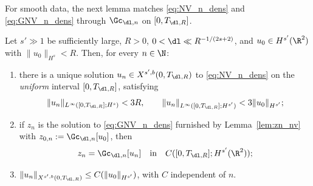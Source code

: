 For smooth data, the next lemma matches \eqref{eq:NV_n_dens} and
\eqref{eq:GNV_n_dens} through $\Gc_{\dl,n}$ on $[0,T_{\dl,R}]$.

\begin{lemma}\label{lem:equiv_n_nv}
Let $s'\gg 1$ be sufficiently large, $R>0$,
$0<\dl\ll R^{-1/(2s+2)}$, and $u_0\in H^{s'}(\R^2)$ with
$\|u_0\|_{H^s}<R$. Then, for every $n\in\N$:
\begin{enumerate}
\item[\textup{(i)}] there is a unique solution
$u_n\in X^{s',b}(0,T_{\dl,R})$ to \eqref{eq:NV_n_dens} on the
\emph{uniform} interval $[0,T_{\dl,R}]$, satisfying
\begin{equation}\label{eq:bounds_un}
\|u_n\|_{L^\infty([0,T_{\dl,R}];H^s)}<3R,
\qquad
\|u_n\|_{L^\infty([0,T_{\dl,R}];H^{s'})}<3\|u_0\|_{H^{s'}};
\end{equation}
\item[\textup{(ii)}] if $z_n$ is the solution to
\eqref{eq:GNV_n_dens} furnished by Lemma~\ref{lem:zn_nv} with
$z_{0,n}:=\Gc_{\dl,n}[u_0]$, then
\begin{equation}\label{eq:equiv_n_nv}
z_n=\Gc_{\dl,n}[u_n]
\quad\text{in}\quad C([0,T_{\dl,R}];H^{s'}(\R^2));
\end{equation}
\item[\textup{(iii)}] $\|u_n\|_{X^{s',b}(0,T_{\dl,R})}\le
C(\|u_0\|_{H^{s'}})$, with $C$ independent of $n$.
\end{enumerate}
\end{lemma}

